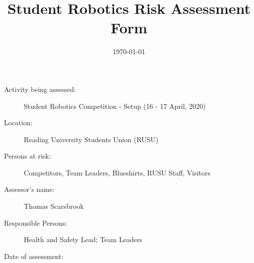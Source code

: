 \documentclass[12pt,a4paper]{scrartcl}
\title{Student Robotics Risk Assessment Form}
\begin{document}
\maketitle

\begin{description}
\item[Activity being assessed:] Student Robotics Competition - Setup (16 - 17 April, 2020)
\item[Location:] Reading University Students Union (RUSU)
\item[Persons at risk:] Competitors, Team Leaders, Blueshirts, RUSU Staff, Visitors
\end{description}

\begin{description}
\item[Assessor's name:] Thomas Scarsbrook
\item[Responsible Persons:] Health and Safety Lead; Team Leaders
\item[Date of assessment:] \date{\today}
\end{description}
\clearpage

\newcommand{\risk}[4]{
 #1 & #2 & #3 & #4 \\
}
\end{document}
